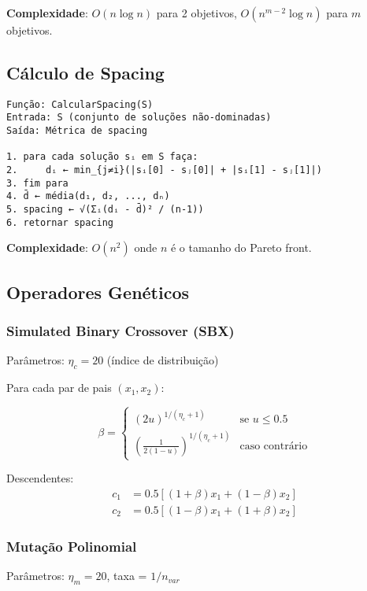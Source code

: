 \textbf{Complexidade}: $O(n \log n)$ para 2 objetivos, $O(n^{m-2} \log n)$ para $m$ objetivos.

\subsection{Cálculo de Spacing}

\begin{verbatim}
Função: CalcularSpacing(S)
Entrada: S (conjunto de soluções não-dominadas)
Saída: Métrica de spacing

1. para cada solução sᵢ em S faça:
2.     dᵢ ← min_{j≠i}(|sᵢ[0] - sⱼ[0]| + |sᵢ[1] - sⱼ[1]|)
3. fim para
4. d̄ ← média(d₁, d₂, ..., dₙ)
5. spacing ← √(Σᵢ(dᵢ - d̄)² / (n-1))
6. retornar spacing
\end{verbatim}

\textbf{Complexidade}: $O(n^2)$ onde $n$ é o tamanho do Pareto front.

\subsection{Operadores Genéticos}

\subsubsection{Simulated Binary Crossover (SBX)}

Parâmetros: $\eta_c = 20$ (índice de distribuição)

Para cada par de pais $(x_1, x_2)$:

\begin{equation}
\beta = 
\begin{cases}
(2u)^{1/(\eta_c + 1)} & \text{se } u \leq 0.5 \\
\left(\frac{1}{2(1-u)}\right)^{1/(\eta_c + 1)} & \text{caso contrário}
\end{cases}
\end{equation}

Descendentes:
\begin{align}
c_1 &= 0.5[(1+\beta)x_1 + (1-\beta)x_2] \\
c_2 &= 0.5[(1-\beta)x_1 + (1+\beta)x_2]
\end{align}

\subsubsection{Mutação Polinomial}

Parâmetros: $\eta_m = 20$, taxa = $1/n_{var}$

